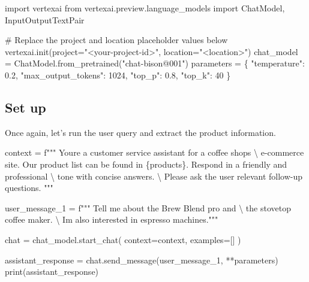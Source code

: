 \documentclass[
  letterpaper,
  DIV=11,
  numbers=noendperiod]{scrreprt}
\newenvironment{Shaded}{\begin{snugshade}}{\end{snugshade}}
\newcommand{\BuiltInTok}[1]{\textcolor[rgb]{0.00,0.23,0.31}{#1}}
\newcommand{\CharTok}[1]{\textcolor[rgb]{0.13,0.47,0.30}{#1}}
\newcommand{\CommentTok}[1]{\textcolor[rgb]{0.37,0.37,0.37}{#1}}
\newcommand{\DecValTok}[1]{\textcolor[rgb]{0.68,0.00,0.00}{#1}}
\newcommand{\FloatTok}[1]{\textcolor[rgb]{0.68,0.00,0.00}{#1}}
\newcommand{\ImportTok}[1]{\textcolor[rgb]{0.00,0.46,0.62}{#1}}
\newcommand{\NormalTok}[1]{\textcolor[rgb]{0.00,0.23,0.31}{#1}}
\newcommand{\OperatorTok}[1]{\textcolor[rgb]{0.37,0.37,0.37}{#1}}
\newcommand{\SpecialCharTok}[1]{\textcolor[rgb]{0.37,0.37,0.37}{#1}}
\newcommand{\SpecialStringTok}[1]{\textcolor[rgb]{0.13,0.47,0.30}{#1}}
\newcommand{\StringTok}[1]{\textcolor[rgb]{0.13,0.47,0.30}{#1}}
\begin{document}
\begin{Shaded}
\begin{Highlighting}[]
\ImportTok{import}\NormalTok{ vertexai}
\ImportTok{from}\NormalTok{ vertexai.preview.language\_models }\ImportTok{import}\NormalTok{ ChatModel, InputOutputTextPair}

\CommentTok{\# Replace the project and location placeholder values below}
\NormalTok{vertexai.init(project}\OperatorTok{=}\StringTok{"\textless{}your{-}project{-}id\textgreater{}"}\NormalTok{, location}\OperatorTok{=}\StringTok{"\textless{}location\textgreater{}"}\NormalTok{)}
\NormalTok{chat\_model }\OperatorTok{=}\NormalTok{ ChatModel.from\_pretrained(}\StringTok{"chat{-}bison@001"}\NormalTok{)}
\NormalTok{parameters }\OperatorTok{=}\NormalTok{ \{}
    \StringTok{"temperature"}\NormalTok{: }\FloatTok{0.2}\NormalTok{,}
    \StringTok{"max\_output\_tokens"}\NormalTok{: }\DecValTok{1024}\NormalTok{,}
    \StringTok{"top\_p"}\NormalTok{: }\FloatTok{0.8}\NormalTok{,}
    \StringTok{"top\_k"}\NormalTok{: }\DecValTok{40}
\NormalTok{\}}
\end{Highlighting}
\end{Shaded}

\hypertarget{set-up}{%
\subsection{Set up}\label{set-up}}

Once again, let's run the user query and extract the product
information.

\begin{Shaded}
\begin{Highlighting}[]
\NormalTok{context }\OperatorTok{=} \SpecialStringTok{f"""}
\SpecialStringTok{You\textquotesingle{}re a customer service assistant for a coffee shop\textquotesingle{}s }\CharTok{\textbackslash{}}
\SpecialStringTok{e{-}commerce site. Our product list can be found in }\SpecialCharTok{\{}\NormalTok{products}\SpecialCharTok{\}}\SpecialStringTok{. Respond in a friendly and professional }\CharTok{\textbackslash{}}
\SpecialStringTok{tone with concise answers. }\CharTok{\textbackslash{}}
\SpecialStringTok{Please ask the user relevant follow{-}up questions.}
\SpecialStringTok{"""}

\NormalTok{user\_message\_1 }\OperatorTok{=} \SpecialStringTok{f"""}
\SpecialStringTok{Tell me about the Brew Blend pro and }\CharTok{\textbackslash{}}
\SpecialStringTok{the stovetop coffee maker. }\CharTok{\textbackslash{}}
\SpecialStringTok{I\textquotesingle{}m also interested in espresso machines."""}

\NormalTok{chat }\OperatorTok{=}\NormalTok{ chat\_model.start\_chat(}
\NormalTok{    context}\OperatorTok{=}\NormalTok{context,}
\NormalTok{    examples}\OperatorTok{=}\NormalTok{[]}
\NormalTok{)}

\NormalTok{assistant\_response }\OperatorTok{=}\NormalTok{ chat.send\_message(user\_message\_1, }\OperatorTok{**}\NormalTok{parameters)}
\BuiltInTok{print}\NormalTok{(assistant\_response)}
\end{Highlighting}
\end{Shaded}
\end{document}
